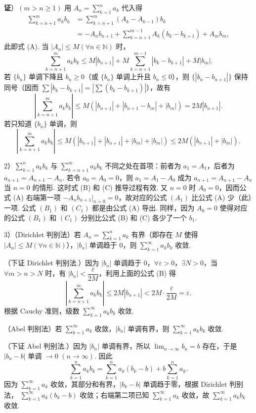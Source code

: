 \documentclass[UTF8, 12pt, fontset=fandol, oneside]{ctexart}
\begin{document}
\noindent\textbf{证}）$(m>n\ge1)$ 用
$A_n=\displaystyle\sum_{k=1}^n a_k$ 代入得
\[
\begin{aligned}
  \sum_{k=n+1}^m a_kb_k
  &=\sum_{k=n+1}^m(A_k-A_{k-1})b_k\\
  &=-A_nb_{n+1}+\sum_{k=n+1}^{m-1}A_k(b_k-b_{k+1})+A_mb_m,
\end{aligned}
\]
此即式 (A). 当 $|A_n|\le M(\forall n\in\mathbb N)$ 时，
\[
  \sum_{k=n+1}^m a_kb_k
  \le M|b_{n+1}|+M\sum_{k=n+1}^{m-1}|b_k-b_{k+1}|+M|b_m|.
\]
若 $\{b_n\}$ 单调下降且 $b_n\ge0$（或 $\{b_n\}$ 单调上升且 $b_n\le0$），则 $\{|b_n-b_{n+1}|\}$ 保持同号（因而 $\sum|b_k-b_{k+1}|=\left|\sum(b_k-b_{k+1})\right|$），故有
\[
  \left|\sum_{k=n+1}^m a_kb_k\right|
  \le M(|b_{n+1}|+|b_{n+1}-b_m|+|b_m|)
  =2M|b_{n+1}|.
\tag{B}
\]
若只知道 $\{b_n\}$ 单调，则
\[
  \left|\sum_{k=n+1}^m a_kb_k\right|
  \le M(|b_{n+1}|+|b_{n+1}|+|b_m|+|b_m|)
  \le2M(|b_{n+1}|+|b_m|).
\tag{C}
\]

2）$\displaystyle\sum_{k=1}^n a_kb_k$ 与
$\displaystyle\sum_{k=n+1}^m a_kb_k$ 不同之处在首项：前者为
$a_1=A_1$，后者为 $a_{n+1}=A_{n+1}-A_n$. 若令
$a_0=A_0=0$，则 $a_1=A_1-A_0$ 成为 $a_{n+1}=A_{n+1}-A_n$ 当 $n=0$ 的情形. 这时式 (B) 和 (C) 推导过程有效. 又 $n=0$ 时 $A_0=0$，因而公式 (A) 右端第一项 $-A_nb_{n+1}|_{n=0}=0$，故对应的公式 $(A_1)$ 比公式 (A) 少（此）一项. 公式 $(B_1)$ 和 $(C_1)$ 都是由公式 (A) 导出. 同样，因为 $A_0=0$ 使得对应的公式 $(B_1)$ 和 $(C_1)$ 分别比公式 (B) 和 (C) 各少了一个 $b_1$.

3）（Dirichlet 判别法）若 $A_n=\displaystyle\sum_{k=1}^n a_k$ 有界（即存在 $M$ 使得 $|A_n|\le M(\forall n\in\mathbb N)$），$|b_n|$ 单调趋于 $0$，则
$\displaystyle\sum_{k=1}^{\infty}a_kb_k$ 收敛.

（下证 Dirichlet 判别法.）因为 $|b_n|$ 单调趋于 $0$，$\forall\varepsilon>0$，$\exists N>0$，当 $\forall m>n>N$ 时，有 $|b_n|<\dfrac{\varepsilon}{2M}$，利用上面的公式 (B) 得
\[
  \left|\sum_{k=n+1}^m a_kb_k\right|
  \le2M|b_{n+1}|<2M\cdot\frac{\varepsilon}{2M}=\varepsilon.
\]
根据 Cauchy 准则，级数 $\displaystyle\sum_{k=1}^{\infty}a_kb_k$ 收敛.

（Abel 判别法）若 $\displaystyle\sum_{k=1}^{\infty}a_k$ 收敛，$|b_n|$ 单调有界，则
$\displaystyle\sum_{k=1}^{\infty}a_kb_k$ 收敛.

（下证 Abel 判别法.）因为 $|b_n|$ 单调有界，所以
$\displaystyle\lim_{n\to\infty}b_n=b$ 存在，于是 $|b_n-b|$ 单调 $\to0$ $(n\to\infty)$. 因此
\[
  \sum_{k=1}^n a_kb_k
  =\sum_{k=1}^n a_k(b_k-b)+b\sum_{k=1}^n a_k.
\]
因为 $\displaystyle\sum_{k=1}^{\infty}a_k$ 收敛，其部分和有界，$|b_k-b|$ 单调趋于零，根据 Dirichlet 判别法，
$\displaystyle\sum_{k=1}^{\infty}a_k(b_k-b)$ 收敛；右端第二项已知
$\displaystyle\sum_{k=1}^{\infty}a_k$ 收敛，故
$\displaystyle\sum_{k=1}^{\infty}a_kb_k$ 收敛.
\end{document}
